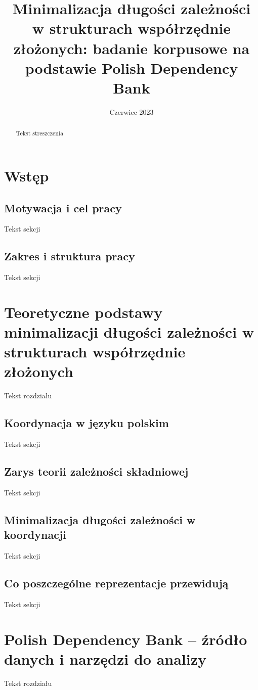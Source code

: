 \documentclass[licencjacka]{pracamgr}
\title{Minimalizacja długości zależności w strukturach współrzędnie złożonych: badanie korpusowe na podstawie Polish Dependency Bank}
\date{Czerwiec 2023}
\begin{document}
\maketitle


\begin{abstract}
Tekst streszczenia
\end{abstract}

\thispagestyle{empty}
\setcounter{page}{3}
\tableofcontents 

\chapter{Wstęp}
\section{Motywacja i cel pracy}
Tekst sekcji
\section{Zakres i struktura pracy}
Tekst sekcji

\chapter{Teoretyczne podstawy minimalizacji długości zależności w strukturach współrzędnie złożonych}
Tekst rozdziału
\section{Koordynacja w języku polskim}
Tekst sekcji
\section{Zarys teorii zależności składniowej}
Tekst sekcji
\section{Minimalizacja długości zależności w koordynacji}
Tekst sekcji
\section{Co poszczególne reprezentacje przewidują}
Tekst sekcji

\chapter{Polish Dependency Bank -- źródło danych i narzędzi do analizy}
Tekst rozdziału
\end{document}
